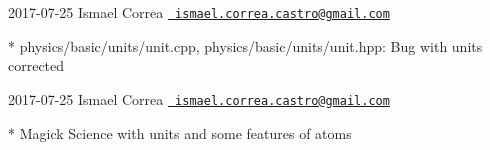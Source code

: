  2017-\/07-\/25 Ismael Correa \href{mailto:ismael.correa.castro@gmail.com}{\texttt{ ismael.\+correa.\+castro@gmail.\+com}} \begin{DoxyVerb}* physics/basic/units/unit.cpp, physics/basic/units/unit.hpp: Bug
with units corrected
\end{DoxyVerb}
 2017-\/07-\/25 Ismael Correa \href{mailto:ismael.correa.castro@gmail.com}{\texttt{ ismael.\+correa.\+castro@gmail.\+com}} \begin{DoxyVerb}* Magick Science with units and some features of atoms
\end{DoxyVerb}
 